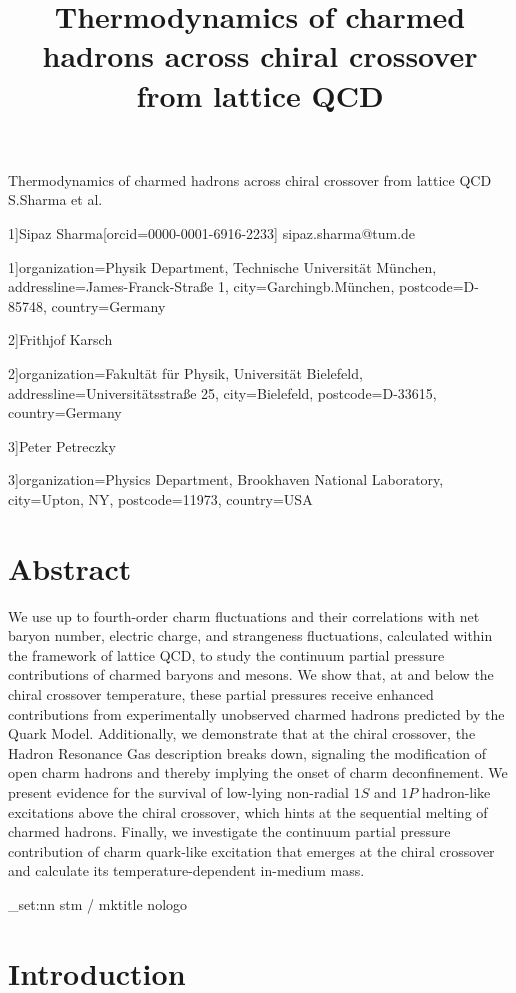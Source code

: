 \documentclass[11pt,a4paper]{article}
\title{Thermodynamics of charmed hadrons across chiral crossover  from lattice QCD}
\begin{document}
\maketitle

Thermodynamics of charmed hadrons across chiral crossover from lattice QCD S.Sharma et al.

1]Sipaz Sharma[orcid=0000-0001-6916-2233] sipaz.sharma@tum.de

1]organization=Physik Department, Technische Universität München, addressline=James-Franck-Straße 1, city=Garchingb.München, postcode=D-85748, country=Germany

2]Frithjof Karsch

2]organization=Fakultät für Physik, Universität Bielefeld, addressline=Universitätsstraße 25, city=Bielefeld, postcode=D-33615, country=Germany

3]Peter Petreczky

3]organization=Physics Department, Brookhaven National Laboratory, city=Upton, NY, postcode=11973, country=USA

\section{Abstract}

We use up to fourth-order charm fluctuations and their correlations with net baryon number, electric charge, and strangeness fluctuations, calculated within the framework of lattice QCD, to study the continuum partial pressure contributions of charmed baryons and mesons. We show that, at and below the chiral crossover temperature, these partial pressures receive enhanced contributions from experimentally unobserved charmed hadrons predicted by the Quark Model. Additionally, we demonstrate that at the chiral crossover, the Hadron Resonance Gas description breaks down, signaling the modification of open charm hadrons and thereby implying the onset of charm deconfinement. We present evidence for the survival of low-lying non-radial $1S$ and $1P$ hadron-like excitations above the chiral crossover, which hints at the sequential melting of charmed hadrons. Finally, we investigate the continuum partial pressure contribution of charm quark-like excitation that emerges at the chiral crossover and calculate its temperature-dependent in-medium mass.

\_set:nn stm / mktitle nologo

\section{Introduction}
\end{document}
